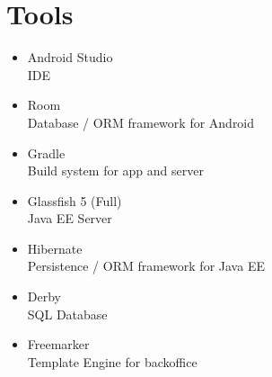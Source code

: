 \chapter{Tools}
\begin{itemize}
\item Android Studio \\ IDE
\item Room \\ Database / ORM framework for Android
\item Gradle \\ Build system for app and server
\item Glassfish 5 (Full) \\ Java EE Server
\item Hibernate \\ Persistence / ORM framework for Java EE
\item Derby \\ SQL Database
\item Freemarker \\ Template Engine for backoffice
\end{itemize}
